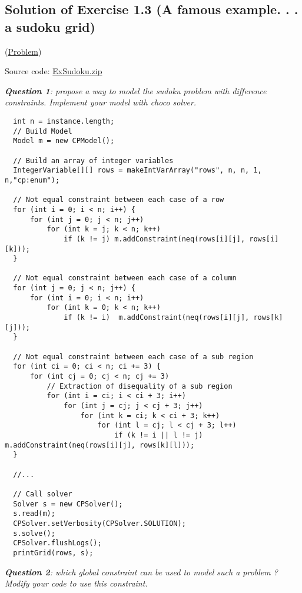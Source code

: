 \subsection{Solution of Exercise 1.3 (A famous example. . . a sudoku grid)}\label{solutions:solutionofexercise1.3}\hypertarget{solutions:solutionofexercise1.3}{}

(\hyperlink{exercises:exercise1.3}{Problem})

Source code: \href{media/zip/exsudoku.zip}{ExSudoku.zip}

\noindent\emph{\textbf{Question 1}: propose a way to model the sudoku problem with difference constraints. Implement your model with choco solver.}

\begin{lstlisting}
  int n = instance.length;
  // Build Model
  Model m = new CPModel();
  
  // Build an array of integer variables
  IntegerVariable[][] rows = makeIntVarArray("rows", n, n, 1, n,"cp:enum");
	
  // Not equal constraint between each case of a row
  for (int i = 0; i < n; i++) {
      for (int j = 0; j < n; j++)
          for (int k = j; k < n; k++)
              if (k != j) m.addConstraint(neq(rows[i][j], rows[i][k]));
  }
                  
  // Not equal constraint between each case of a column
  for (int j = 0; j < n; j++) {
      for (int i = 0; i < n; i++)
          for (int k = 0; k < n; k++)
              if (k != i)  m.addConstraint(neq(rows[i][j], rows[k][j]));
  }

  // Not equal constraint between each case of a sub region
  for (int ci = 0; ci < n; ci += 3) {
      for (int cj = 0; cj < n; cj += 3)
          // Extraction of disequality of a sub region
          for (int i = ci; i < ci + 3; i++)
              for (int j = cj; j < cj + 3; j++)
                  for (int k = ci; k < ci + 3; k++)
                      for (int l = cj; l < cj + 3; l++)
                          if (k != i || l != j) m.addConstraint(neq(rows[i][j], rows[k][l]));
  }
	
  //...
	
  // Call solver
  Solver s = new CPSolver();
  s.read(m);
  CPSolver.setVerbosity(CPSolver.SOLUTION);
  s.solve();
  CPSolver.flushLogs();
  printGrid(rows, s);
\end{lstlisting}

\noindent\emph{\textbf{Question 2}: which global constraint can be used to model such a problem ? Modify your code to use this constraint.}

